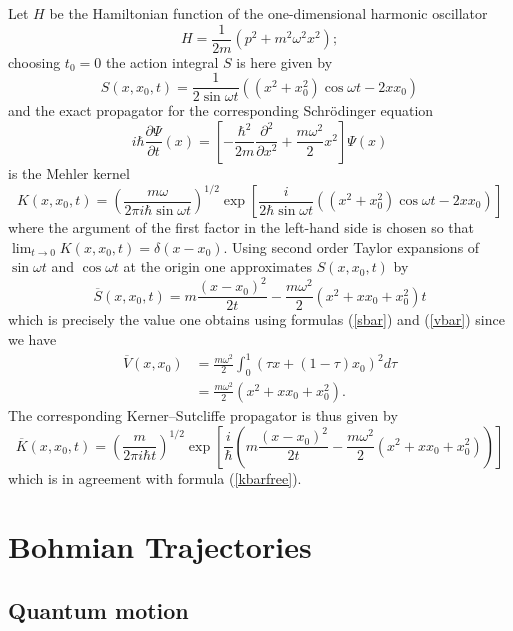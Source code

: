\documentclass[12pt]{article}%
\begin{document}
Let $H$ be the Hamiltonian function of the one-dimensional harmonic oscillator%
\[
H=\frac{1}{2m}(p^{2}+m^{2}\omega^{2}x^{2});
\]
choosing $t_{0}=0$ the action integral $S$ is here given by
\[
S(x,x_{0},t)=\frac{1}{2\sin\omega t}((x^{2}+x_{0}^{2})\cos\omega t-2xx_{0})
\]
and the exact propagator for the corresponding Schr\"{o}dinger equation%
\[
i\hbar\frac{\partial\Psi}{\partial t}(x)=\left[  -\frac{\hbar^{2}}{2m}%
\frac{\partial^{2}}{\partial x^{2}}+\frac{m\omega^{2}}{2}x^{2}\right]  \Psi(x)
\]
is the Mehler kernel%
\begin{equation}
K(x,x_{0},t)=\left(  \frac{m\omega}{2\pi i\hbar\sin\omega t}\right)
^{1/2}\exp\left[  \frac{i}{2\hbar\sin\omega t}((x^{2}+x_{0}^{2})\cos\omega
t-2xx_{0})\right]  \label{mehler}%
\end{equation}
where the argument of the first factor in the left-hand side is chosen so that
$\lim_{t\rightarrow0}K(x,x_{0},t)=\delta(x-x_{0})$. Using second order Taylor
expansions of $\sin\omega t$ and $\cos\omega t$ at the origin one approximates
$S(x,x_{0},t)$ by
\[
\overline{S}(x,x_{0},t)=m\frac{(x-x_{0})^{2}}{2t}-\frac{m\omega^{2}}{2}%
(x^{2}+xx_{0}+x_{0}^{2})t
\]
which is precisely the value one obtains using formulas (\ref{sbar}) and
(\ref{vbar}) since we have%
\begin{align*}
\overline{V}(x,x_{0}) &  =\frac{m\omega^{2}}{2}\int_{0}^{1}(\tau
x+(1-\tau)x_{0})^{2}d\tau\\
&  =\frac{m\omega^{2}}{2}(x^{2}+xx_{0}+x_{0}^{2}).
\end{align*}
The corresponding Kerner--Sutcliffe propagator is thus given by%
\begin{equation}
\overline{K}(x,x_{0},t)=\left(  \frac{m}{2\pi i\hbar t}\right)  ^{1/2}%
\exp\left[  \frac{i}{\hbar}\left(  m\frac{(x-x_{0})^{2}}{2t}-\frac{m\omega
^{2}}{2}(x^{2}+xx_{0}+x_{0}^{2})\right)  \right]
\end{equation}
which is in agreement with formula (\ref{kbarfree}).

\section{Bohmian Trajectories\label{sec2}}

\subsection{Quantum motion}
\end{document}
